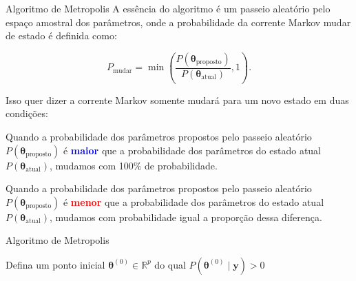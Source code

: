 \begin{frame}{Algoritmo de Metropolis}
  A essência do algoritmo é um passeio aleatório pelo espaço amostral dos parâmetros,
  onde a probabilidade da corrente Markov mudar de estado é definida como:

  $$
  P_{\text{mudar}} = \min\left({\frac{P (\boldsymbol{\theta}_{\text{proposto}})}{P (\boldsymbol{\theta}_{\text{atual}})}},1\right).
  $$

  Isso quer dizer a corrente Markov somente mudará para um novo estado em duas condições:
  \begin{vfilleditems}
    \small
    \item \small Quando a probabilidade dos parâmetros propostos pelo passeio aleatório
    $P(\boldsymbol{\theta}_{\text{proposto}})$ é \textbf{\textcolor{blue}{maior}}
    que a probabilidade dos parâmetros do estado atual
    $P(\boldsymbol{\theta}_{\text{atual}})$, mudamos com 100\% de probabilidade.

    \item \small Quando a probabilidade dos parâmetros propostos pelo passeio aleatório
    $P(\boldsymbol{\theta}_{\text{proposto}})$ é \textbf{\textcolor{red}{menor}}
    que a probabilidade dos parâmetros do estado atual
    $P(\boldsymbol{\theta}_{\text{atual}})$, mudamos com probabilidade igual a
    proporção dessa diferença.
  \end{vfilleditems}
\end{frame}

\begin{frame}[fragile]{Algoritmo de Metropolis}
    \SetAlCapFnt{\normalsize}
    \SetAlCapNameFnt{\normalsize}
    \begin{algorithm}[H]
    \DontPrintSemicolon
    \SetAlgoNoEnd
    \SetAlgoLined
    Defina um ponto inicial $\boldsymbol{\theta}^{(0)} \in \mathbb{R}^p$ do qual $P\left(\boldsymbol{\theta}^{(0)} \mid \boldsymbol{y} \right) > 0$\;
     \caption{Metropolis}
    \end{algorithm}
\end{frame}

